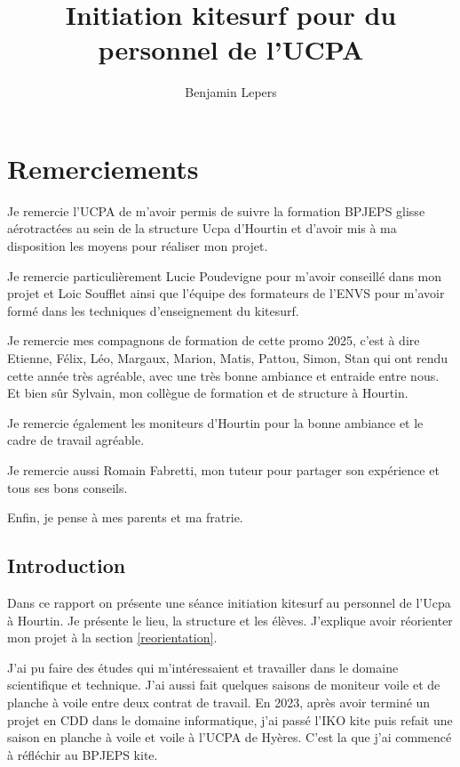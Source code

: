 \documentclass[11pt,a4paper]{report}
\begin{document}
\author{Benjamin Lepers}
\title{Initiation kitesurf pour du personnel de l'UCPA}
\maketitle
\chapter*{Remerciements}
Je remercie l'UCPA de m'avoir permis de suivre la formation
BPJEPS glisse aérotractées au sein de la structure Ucpa 
d'Hourtin et d'avoir
mis à ma disposition les moyens pour réaliser mon projet.
 
Je remercie particulièrement Lucie Poudevigne pour m'avoir
conseillé  dans mon projet et Loic Soufflet ainsi que 
l'équipe des formateurs de l'ENVS pour m'avoir formé 
dans les techniques d'enseignement du kitesurf.

Je remercie mes compagnons de formation de cette promo 2025,
c'est à dire Etienne, Félix, Léo, Margaux, Marion, Matis, Pattou,
Simon, Stan qui ont rendu cette année très agréable,
avec une très bonne ambiance et entraide entre nous.
Et bien s\^ur Sylvain, mon collègue de formation et 
de structure à Hourtin.

Je remercie également les moniteurs d'Hourtin  pour la
bonne ambiance et le cadre de travail agréable.

Je remercie aussi Romain Fabretti, mon tuteur pour
partager son expérience et tous ses bons conseils.

Enfin, je pense à  mes parents et ma fratrie.


\tableofcontents
\newpage
\section{Introduction}

Dans ce rapport on présente une séance initiation kitesurf au
personnel de l'Ucpa à Hourtin. Je présente le lieu, la structure 
et les élèves. J'explique avoir réorienter mon projet à la section
 \ref{reorientation}.

J'ai pu faire des études qui m'intéressaient et travailler dans
le domaine scientifique et technique. J'ai aussi fait quelques 
saisons de moniteur voile et de planche à voile entre deux contrat 
de travail.
En 2023, après avoir terminé un projet
en CDD dans le domaine informatique, j'ai passé l'IKO kite\cite{iko}
puis refait une saison en planche à voile et voile à l'UCPA de 
Hyères. C'est la que j'ai commencé à réfléchir au BPJEPS kite.
\end{document}
